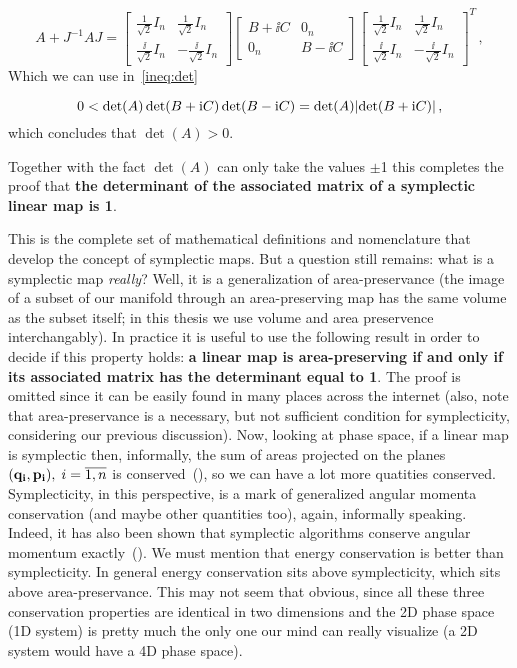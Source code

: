 \documentclass[12pt, class=report, crop=false]{standalone}
\begin{document}
\begin{equation*}
  A + J^{-1} A J =
  \begin{bmatrix}
    \frac{1}{\sqrt{2}} I_n & \frac{1}{\sqrt{2}} I_n\\
    \frac{\ii}{\sqrt{2}} I_n & -\frac{\ii}{\sqrt{2}} I_n
  \end{bmatrix}
  \begin{bmatrix}
    B+ \ii C & 0_n\\
    0_n & B-\ii C
  \end{bmatrix}
  \begin{bmatrix}
    \frac{1}{\sqrt{2}} I_n & \frac{1}{\sqrt{2}} I_n\\
    \frac{\ii}{\sqrt{2}} I_n & -\frac{\ii}{\sqrt{2}} I_n
  \end{bmatrix}^T\,,
\end{equation*}
Which we can use in~\cref{ineq:det}

\begin{equation*}
  0 < \det(A) \det(B+\mathrm{i} C) \det(B-\mathrm{i} C) = \det(A) \abs{\det(B+\mathrm{i} C)}\,,
\end{equation*}
which concludes that \(\det(A)>0\).

Together with the fact \(\det(A)\) can only take the values \(\pm\)1 this completes the proof that \textbf{the determinant of the associated matrix of a symplectic linear map is 1}.

This is the complete set of mathematical definitions and nomenclature that develop the concept of symplectic maps. But a question still remains: what is a symplectic map \textit{really}? Well, it is a generalization of area-preservance (the image of a subset of our manifold through an area-preserving map has the same volume as the subset itself; in this thesis we use volume and area preservence interchangably). In practice it is useful to use the following result in order to decide if this property holds: \textbf{a linear map is area-preserving if and only if its associated matrix has the determinant equal to 1}. The proof is omitted since it can be easily found in many places across the internet (also, note that area-preservance is a necessary, but not sufficient condition for symplecticity, considering our previous discussion). Now, looking at phase space, if a linear map is symplectic then, informally, the sum of areas projected on the planes \((\vb{q_i},\vb{p_i}),\;i = \overline{1,n}\) is conserved~(\cite{weissteinSymplecticMap}), so we can have a lot more quatities conserved. Symplecticity, in this perspective, is a mark of generalized angular momenta conservation (and maybe other quantities too), again, informally speaking. Indeed, it has also been shown that symplectic algorithms conserve angular momentum exactly~(\cite{zhangSymplecticIntegratorsConservation1995}). We must mention that energy conservation is better than symplecticity. In general energy conservation sits above symplecticity, which sits above area-preservance. This may not seem that obvious, since all these three conservation properties are identical in two dimensions and the 2D phase space (1D system) is pretty much the only one our mind can really visualize (a 2D system would have a 4D phase space).
\end{document}
